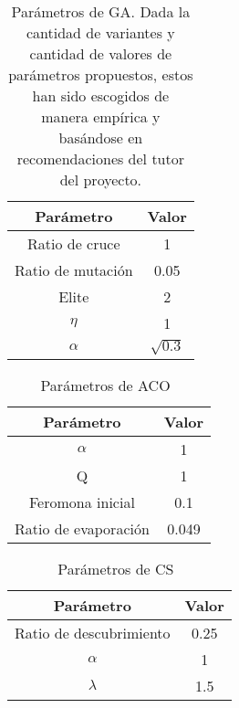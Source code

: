 \begin{table}[htp]
    \centering
    \begin{tabular}{ c c }
        \hline
        \textbf{Parámetro} & \textbf{Valor} \\
        \hline
        Ratio de cruce     & 1              \\
        Ratio de mutación  & 0.05           \\
        Elite              & 2              \\
        $\eta$             & 1              \\
        $\alpha$           & $\sqrt{0.3}$   \\
        \hline
    \end{tabular}
    \caption{Parámetros de GA. Dada la cantidad de variantes y cantidad de valores de parámetros propuestos, estos han sido escogidos de manera empírica y basándose en recomendaciones del tutor del proyecto.}
\end{table}

\begin{table}[htp]
    \centering
    \begin{tabular}{ c c }
        \hline
        \textbf{Parámetro}   & \textbf{Valor} \\
        \hline
        $\alpha$             & 1              \\
        Q                    & 1              \\
        Feromona inicial     & 0.1            \\
        Ratio de evaporación & 0.049          \\
        \hline
    \end{tabular}
    \caption{Parámetros de ACO~\cite{kashef_advanced_2015}}
\end{table}

\begin{table}[htp]
    \centering
    \begin{tabular}{ c c }
        \hline
        \textbf{Parámetro}      & \textbf{Valor} \\
        \hline
        Ratio de descubrimiento & 0.25           \\
        $\alpha$                & 1              \\
        $\lambda$               & 1.5            \\
        \hline
    \end{tabular}
    \caption{Parámetros de CS~\cite{rodrigues_bcs_2013}}
\end{table}

